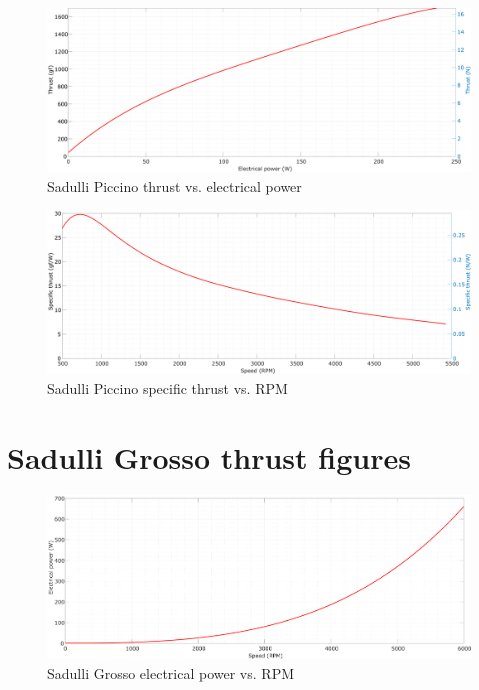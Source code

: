 \begin{figure}[!hbt]
    \centerline{\includegraphics[width=1\textwidth]{figures/thrust_graphs/piccino_thrust-power.pdf}}
    \caption{Sadulli Piccino thrust  vs. electrical power}
\end{figure}

\begin{figure}[!hbt]
    \centerline{\includegraphics[width=1\textwidth]{figures/thrust_graphs/piccino_specific_thrust-rpm.pdf}}
    \caption{Sadulli Piccino specific thrust vs. RPM}
\end{figure}

\newpage

\section{Sadulli Grosso thrust figures}

\begin{figure}[!hbt]
    \centerline{\includegraphics[width=1\textwidth]{figures/thrust_graphs/grosso_power-rpm.pdf}}
    \caption{Sadulli Grosso electrical power vs. RPM}
\end{figure}

